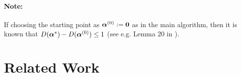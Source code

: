 \documentclass{article} %
\newcommand{\localSDCA}{\textsc{LocalSDCA}\xspace}
\begin{document}
\paragraph{Note:}
If choosing the starting point as $\bm{\alpha}^{(0)} := {\bf 0}$ as in the main algorithm, then it is known that $D(\bm{\alpha}^*) - D(\bm{\alpha}^{(0)})\leq 1$ (see e.g. Lemma 20 in \cite{ShalevShwartz:2013wl}).
%
%
%
% 
 









%
\section{Related Work}\label{relatedwork}


\end{document}
